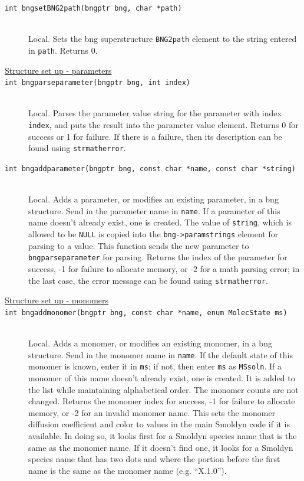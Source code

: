 \documentclass {scrbook}
\newcommand {\ttt} {\texttt}
\begin{document}
\begin{description}
\item[\ttt{int bngsetBNG2path(bngptr bng, char *path)}]
\hfill \\
Local. Sets the bng superstructure \ttt{BNG2path} element to the string entered in \ttt{path}. Returns 0.

\item[\underline{Structure set up - parameters}]

\item[\ttt{int bngparseparameter(bngptr bng, int index)}]
\hfill \\
Local. Parses the parameter value string for the parameter with index \ttt{index}, and puts the result into the parameter value element. Returns 0 for success or 1 for failure. If there is a failure, then its description can be found using \ttt{strmatherror}.

\item[\ttt{int bngaddparameter(bngptr bng, const char *name, const char *string)}]
\hfill \\
Local. Adds a parameter, or modifies an existing parameter, in a bng structure. Send in the parameter name in \ttt{name}. If a parameter of this name doesn't already exist, one is created. The value of \ttt{string}, which is allowed to be \ttt{NULL} is copied into the \ttt{bng->paramstrings} element for parsing to a value. This function sends the new parameter to \ttt{bngparseparameter} for parsing. Returns the index of the parameter for success, -1 for failure to allocate memory, or -2 for a math parsing error; in the last case, the error message can be found using \ttt{strmatherror}.

\item[\underline{Structure set up - monomers}]

\item[\ttt{int bngaddmonomer(bngptr bng, const char *name, enum MolecState ms)}]
\hfill \\
Local. Adds a monomer, or modifies an existing monomer, in a bng structure. Send in the monomer name in \ttt{name}. If the default state of this monomer is known, enter it in \ttt{ms}; if not, then enter \ttt{ms} as \ttt{MSsoln}. If a monomer of this name doesn't already exist, one is created. It is added to the list while maintaining alphabetical order. The monomer counts are not changed. Returns the monomer index for success, -1 for failure to allocate memory, or -2 for an invalid monomer name. This sets the monomer diffusion coefficient and color to values in the main Smoldyn code if it is available. In doing so, it looks first for a Smoldyn species name that is the same as the monomer name. If it doesn't find one, it looks for a Smoldyn species name that has two dots and where the portion before the first name is the same as the monomer name (e.g. ``X.1.0'').


\end{description}
\end{document}
